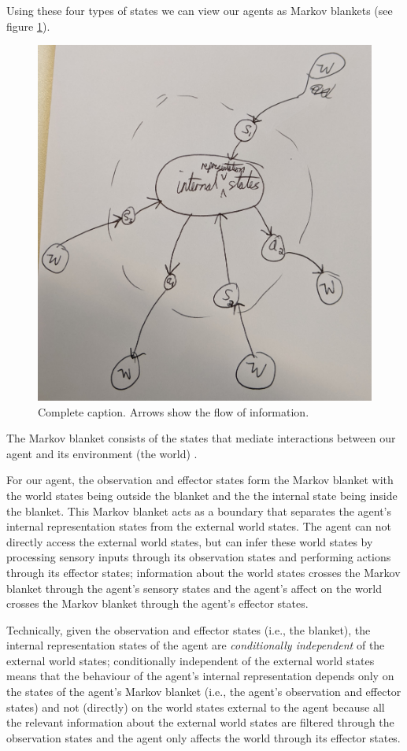 Using these four types of states we can view our agents as Markov blankets (see figure \ref{fig:markov_blanket}).

\begin{figure}
    \centering
    \includegraphics[width=0.5\linewidth]{2MathematicalFramework/InitialFramework/Images/markov_blanket.jpg}
    \caption{
    Complete caption.
    Arrows show the flow of information.
    }
    \label{fig:markov_blanket}
\end{figure}

The Markov blanket consists of the states that mediate interactions between our agent and its environment (the world) \cite{Ramstead2020}.

For our agent, the observation and effector states form the Markov blanket with the world states being outside the blanket and the the internal state being inside the blanket.
This Markov blanket acts as a boundary that separates the agent's internal representation states from the external world states.
The agent can not directly access the external world states, but can infer these world states by processing sensory inputs through its observation states and performing actions through its effector states; information about the world states crosses the Markov blanket through the agent's sensory states and the agent's affect on the world crosses the Markov blanket through the agent's effector states.

Technically, given the observation and effector states (i.e., the blanket), the internal representation states of the agent are \emph{conditionally independent} of the external world states; conditionally independent of the external world states means that the behaviour of the agent's internal representation depends only on the states of the agent's Markov blanket (i.e., the agent's observation and effector states) and not (directly) on the world states external to the agent because all the relevant information about the external world states are filtered through the observation states and the agent only affects the world through its effector states.

